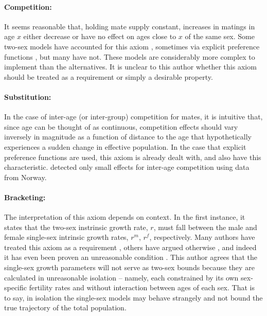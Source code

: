 \paragraph{Competition:} It seems reasonable that, holding mate supply constant,
increases in matings in age $x$ either decrease or have no effect on ages
close to $x$ of the same sex. Some two-sex models have accounted for this axiom
\citep{henry1972nuptiality, mc1975models, choo2006estimating}, sometimes via
explicit preference functions \citep{parlett1972can, pollard1993interaction},
but many have not. These models are considerably more complex to implement than the 
alternatives. It is unclear to this author whether this axiom should be treated
as a requirement or simply a desirable property. 

\paragraph{Substitution:} In the case of inter-age (or inter-group) competition
for mates, it is intuitive that, since age can be thought of as
continuous, competition effects should vary inversely in magnitude as a function
of distance to the age that hypothetically experiences a sudden change in
effective population. In the case that explicit preference functions are used, this axiom
is already dealt with, and \citet{choo2006estimating} also have this
characteristic. \citet{keilman1999female}
detected only small effects for inter-age competition using data from Norway.

\paragraph{Bracketing:} The interpretation of this axiom depends on context.
In the first instance, it states that the two-sex instrinsic growth rate, $r$,
must fall between the male and female single-sex intrinsic growth rates, $r^m$, $r^f$, 
respectively. Many authors have treated this axiom as a requirement
\citep{pollard1948measurement,coale1972growth, gupta1976interactive, mitra1978derivation}, 
others have
argued otherwise \citep{gupta1973us,schoen1981harmonic}, and indeed it has even
been proven an unreasonable condition \citep{yellin1977comparison}. This author
agrees that the single-sex growth parameters will not serve as two-sex bounds
because they are calculated in unreasonable isolation -- namely, each
constrained by its own sex-specific fertility rates and without interaction between ages of
each sex. That is to say, in isolation the single-sex models may behave
strangely and not bound the true trajectory of the total population.

